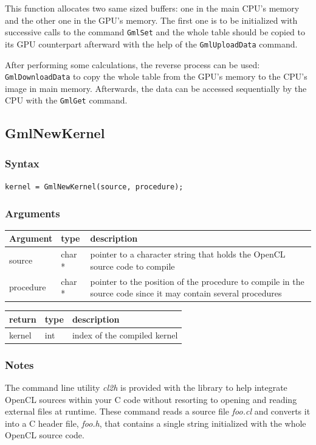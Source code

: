 \documentclass[a4paper,12pt]{article}
\begin{document}
This function allocates two same sized buffers: one in the main CPU's memory and the other one in the GPU's memory. The first one is to be initialized with successive calls to the command {\tt GmlSet} and the whole table should be copied to its GPU counterpart afterward with the help of the {\tt GmlUploadData} command.

After performing some calculations, the reverse process can be used: {\tt GmlDownloadData} to copy the whole table from the GPU's memory to the CPU's image in main memory. Afterwards, the data can be accessed sequentially by the CPU with the {\tt GmlGet} command.


\subsection{GmlNewKernel}
\subsubsection*{Syntax}
{\tt kernel = GmlNewKernel(source, procedure);}
\subsubsection*{Arguments}

\begin{tabular}{|m{2cm}|m{1.5cm}|m{10.5cm}|}
\hline
Argument   & type   & description \\
\hline
source     & char * & pointer to a character string that holds the OpenCL source code to compile \\
\hline
procedure  & char * & pointer to the position of the procedure to compile in the source code since it may contain several procedures \\
\hline
\end{tabular}

\medskip

\begin{tabular}{|m{2cm}|m{1.5cm}|m{10.5cm}|}
\hline
return     & type   & description \\
\hline
kernel     & int    & index of the compiled kernel \\
\hline
\end{tabular}

\subsubsection*{Notes}
The command line utility \emph{cl2h} is provided with the library to help integrate OpenCL sources within your C code without resorting to opening and reading external files at runtime. These command reads a source file \emph{foo.cl} and converts it into a C header file, \emph{foo.h}, that contains a single string initialized with the whole OpenCL source code.
\end{document}
